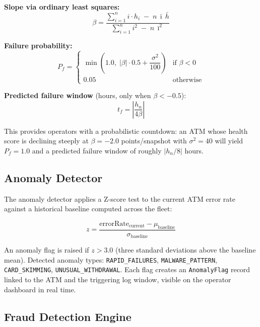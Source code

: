 \documentclass[11pt,a4paper]{article}
\begin{document}
\textbf{Slope via ordinary least squares:}
\begin{equation}
  \beta = \frac{\displaystyle\sum_{i=1}^{n} i \cdot h_i \;-\; n\,\bar{\imath}\,\bar{h}}
               {\displaystyle\sum_{i=1}^{n} i^2 \;-\; n\,\bar{\imath}^2}
\end{equation}

\textbf{Failure probability:}
\begin{equation}
  P_f =
  \begin{cases}
    \min\!\left(1.0,\; |\beta| \cdot 0.5 + \dfrac{\sigma^2}{100}\right) & \text{if } \beta < 0 \\[6pt]
    0.05 & \text{otherwise}
  \end{cases}
\end{equation}

\textbf{Predicted failure window} (hours, only when $\beta < -0.5$):
\begin{equation}
  t_f = \left|\frac{h_n}{4\beta}\right|
\end{equation}

This provides operators with a probabilistic countdown: an ATM whose health score is declining steeply at $\beta = -2.0$ points/snapshot with $\sigma^2 = 40$ will yield $P_f = 1.0$ and a predicted failure window of roughly $|h_n / 8|$ hours.

\subsection{Anomaly Detector}

The anomaly detector applies a Z-score test to the current ATM error rate against a historical baseline computed across the fleet:

\begin{equation}
  z = \frac{\text{errorRate}_{\text{current}} - \mu_{\text{baseline}}}{\sigma_{\text{baseline}}}
\end{equation}

An anomaly flag is raised if $z > 3.0$ (three standard deviations above the baseline mean). Detected anomaly types: \texttt{RAPID\_FAILURES}, \texttt{MALWARE\_PATTERN}, \texttt{CARD\_SKIMMING}, \texttt{UNUSUAL\_WITHDRAWAL}. Each flag creates an \texttt{AnomalyFlag} record linked to the ATM and the triggering log window, visible on the operator dashboard in real time.

\subsection{Fraud Detection Engine}
\end{document}
